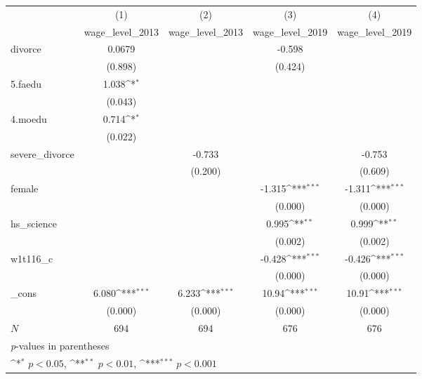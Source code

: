 {
\def\sym#1{\ifmmode^{#1}\else\(^{#1}\)\fi}
\begin{tabular}{l*{4}{c}}
\hline\hline
            &\multicolumn{1}{c}{(1)}&\multicolumn{1}{c}{(2)}&\multicolumn{1}{c}{(3)}&\multicolumn{1}{c}{(4)}\\
            &\multicolumn{1}{c}{wage\_level\_2013}&\multicolumn{1}{c}{wage\_level\_2013}&\multicolumn{1}{c}{wage\_level\_2019}&\multicolumn{1}{c}{wage\_level\_2019}\\
\hline
divorce     &      0.0679         &                     &      -0.598         &                     \\
            &     (0.898)         &                     &     (0.424)         &                     \\
[1em]
5.faedu     &       1.038\sym{*}  &                     &                     &                     \\
            &     (0.043)         &                     &                     &                     \\
[1em]
4.moedu     &       0.714\sym{*}  &                     &                     &                     \\
            &     (0.022)         &                     &                     &                     \\
[1em]
severe\_divorce&                     &      -0.733         &                     &      -0.753         \\
            &                     &     (0.200)         &                     &     (0.609)         \\
[1em]
female      &                     &                     &      -1.315\sym{***}&      -1.311\sym{***}\\
            &                     &                     &     (0.000)         &     (0.000)         \\
[1em]
hs\_science  &                     &                     &       0.995\sym{**} &       0.999\sym{**} \\
            &                     &                     &     (0.002)         &     (0.002)         \\
[1em]
w1t116\_c    &                     &                     &      -0.428\sym{***}&      -0.426\sym{***}\\
            &                     &                     &     (0.000)         &     (0.000)         \\
[1em]
\_cons      &       6.080\sym{***}&       6.233\sym{***}&       10.94\sym{***}&       10.91\sym{***}\\
            &     (0.000)         &     (0.000)         &     (0.000)         &     (0.000)         \\
\hline
\(N\)       &         694         &         694         &         676         &         676         \\
\hline\hline
\multicolumn{5}{l}{\footnotesize \textit{p}-values in parentheses}\\
\multicolumn{5}{l}{\footnotesize \sym{*} \(p<0.05\), \sym{**} \(p<0.01\), \sym{***} \(p<0.001\)}\\
\end{tabular}
}
